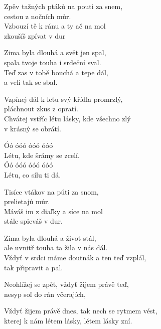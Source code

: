 
\vspace{-3 pt}
\ve{}
Zpěv tažných ptáků na pouti za snem,\\
cestou z nočních můr.\\
Vzbouzí tě k ránu a ty ač na mol\\
zkoušíš zpívat v dur

Zima byla dlouhá a svět jen spal,\\
spala tvoje touha i srdeční sval.\\
Teď zas v tobě bouchá a tepe dál,\\
a velí tak se sbal.

\vspace{-3 pt}
\cho{}
Vzpínej dál k letu svý křídla promrzlý,\\
pláchnout zkus z opratí.\\
Chvátej vstříc létu lásky, kde všechno zlý\\
v krásný se obrátí.

Óó óóó óóó óóó\\
Létu, kde šrámy se zcelí.\\
Óó óóó óóó óóó\\
Létu, co sílu ti dá.

\vspace{-3 pt}
\ve{}
Tisíce vtákov na púti za snom,\\
prelietajú múr.\\
Máváš im z diaľky a síce na mol\\
stále spieváš v dur.

Zima byla dlouhá a život stál,\\
ale uvnitř touha ta žila v nás dál.\\
Vždyť v srdci máme doutnák a ten teď vzplál,\\
tak připravit a pal.

\vspace{-3 pt}
\cho{}

\vspace{-3 pt}
\re{*:}
Neohlížej se zpět, vždyť žijem právě teď,\\
nesyp soľ do rán včerajích,

Vždyť žijem právě dnes, tak nech se rytmem vést,\\
kterej k nám létem lásky, létem lásky zní.

\vspace{-3 pt}
\cho{}
\vspace{-3 pt}

\esong
\vspace{-5 pt}